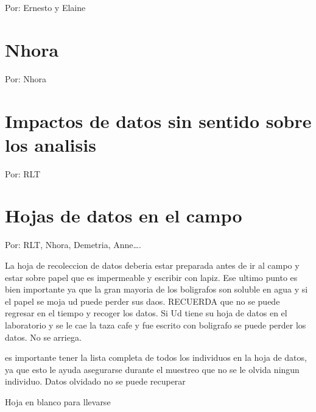 \documentclass[
]{book}
\theoremstyle{definition}
\theoremstyle{definition}
\theoremstyle{definition}
\theoremstyle{definition}
\theoremstyle{remark}
\begin{document}
Por: Ernesto y Elaine

\hypertarget{nhora}{%
\chapter{Nhora}\label{nhora}}

Por: Nhora

\hypertarget{impactos-de-datos-sin-sentido-sobre-los-analisis}{%
\chapter{Impactos de datos sin sentido sobre los analisis}\label{impactos-de-datos-sin-sentido-sobre-los-analisis}}

Por: RLT

\hypertarget{hojas-de-datos-en-el-campo}{%
\chapter{Hojas de datos en el campo}\label{hojas-de-datos-en-el-campo}}

Por: RLT, Nhora, Demetria, Anne\ldots.

La hoja de recoleccion de datos deberia estar preparada antes de ir al campo y estar sobre papel que es impermeable y escribir con lapiz. Ese ultimo punto es bien importante ya que la gran mayoria de los boligrafos son soluble en agua y si el papel se moja ud puede perder sus daos. RECUERDA que no se puede regresar en el tiempo y recoger los datos. Si Ud tiene su hoja de datos en el laboratorio y se le cae la taza cafe y fue escrito con boligrafo se puede perder los datos. No se arriega.

es importante tener la lista completa de todos los individuos en la hoja de datos, ya que esto le ayuda asegurarse durante el muestreo que no se le olvida ningun individuo. Datos olvidado no se puede recuperar

Hoja en blanco para llevarse
\end{document}
